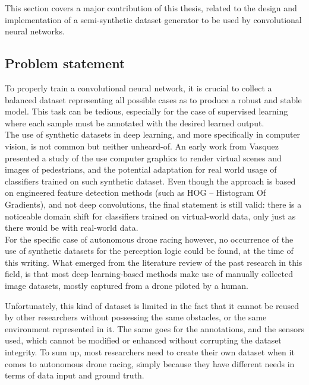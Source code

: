This section covers a major contribution of this thesis, related to the design
and implementation of a semi-synthetic dataset generator to be used by
convolutional neural networks.

\subsection{Problem statement}

To properly train a convolutional neural network, it is crucial to collect a
balanced dataset representing all possible cases as to produce a robust and
stable model. This task can be tedious, especially for the case of supervised
learning where each sample must be annotated with the desired learned output.\\

The use of synthetic datasets in deep learning, and more specifically in
computer vision, is not common but neither unheard-of. An early work from
Vasquez \etal~\cite{PedestrianDetection} presented a study of the use computer
graphics to render virtual scenes and images of pedestrians, and the potential
adaptation for real world usage of classifiers trained on such synthetic
dataset. Even though the approach is based on engineered feature detection
methods (such as HOG -- Histogram Of Gradients), and not deep convolutions, the
final statement is still valid: there is a noticeable domain shift for
classifiers trained on virtual-world data, only just as there would be with
real-world data.\\


For the specific case of autonomous drone racing however, no occurrence of the
use of synthetic datasets for the perception logic could be found, at the time
of this writing. What emerged from the literature review of the past research
in this field, is that most deep learning-based methods make use of manually
collected image datasets, mostly captured from a drone piloted by a human.

Unfortunately, this kind of dataset is limited in the fact that it cannot be
reused by other researchers without possessing the same obstacles, or the same
environment represented in it. The same goes for the annotations, and the
sensors used, which cannot be modified or enhanced without corrupting the
dataset integrity. To sum up, most researchers need to create their own dataset
when it comes to autonomous drone racing, simply because they have different
needs in terms of data input and ground truth.\\

